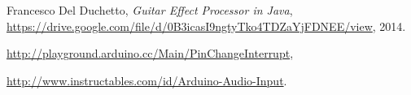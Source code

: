 \documentclass[a4paper,11pt]{article}
\begin{document}
\begin{thebibliography}{9}

  Francesco Del Duchetto,
  \emph{Guitar Effect Processor in Java},
  \url{https://drive.google.com/file/d/0B3icasI9ngtyTko4TDZaYjFDNEE/view},
  2014.

	\url{http://playground.arduino.cc/Main/PinChangeInterrupt},

	\url{http://www.instructables.com/id/Arduino-Audio-Input}.

\end{thebibliography}
\end{document}
